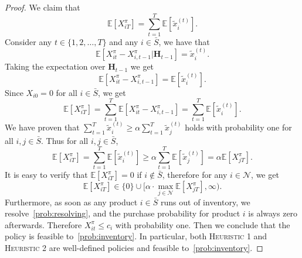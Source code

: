 \documentclass[10pt,a4paper]{amsart}
\begin{document}
\begin{proof}
We claim that
\begin{equation*}
\mathbb{E}[X_{iT}^\pi]=\sum_{t=1}^T\mathbb{E}[\tilde{x}_i^{(t)}].
\end{equation*}
Consider any $t\in\{1,2,\dots,T\}$ and any $i\in\bar{S}$, we have that
\begin{equation*}
\mathbb{E}[X_{it}^\pi-X_{i,t-1}^\pi|\bm{H}_{t-1}]=\tilde{x}_i^{(t)}.
\end{equation*}
Taking the expectation over $\bm{H}_{t-1}$ we get
\begin{equation*}
\mathbb{E}[X_{it}^\pi-X_{i,t-1}^\pi]=\mathbb{E}[\tilde{x}_i^{(t)}].
\end{equation*}
Since $X_{i0}=0$ for all $i\in\bar{S}$, we get
\begin{equation*}
\mathbb{E}[X_{iT}^\pi]=\sum_{t=1}^T\mathbb{E}[X^\pi_{it}-X^\pi_{i,t-1}]=\sum_{t=1}^T\mathbb{E}[\tilde{x}_i^{(t)}].
\end{equation*}
We have proven that $\sum_{t=1}^T\tilde{x}_i^{(t)}\geq \alpha\sum_{t=1}^T\tilde{x}_j^{(t)}$ holds with probability one for all $i,j\in\bar{S}$. Thus for all $i,j\in\bar{S}$,
$$\mathbb{E}[X_{iT}^\pi]=\sum_{t=1}^T\mathbb{E}[\tilde{x}_i^{(t)}]\geq\alpha\sum_{t=1}^T\mathbb{E}[\tilde{x}_j^{(t)}]=\alpha\mathbb{E}[X_{jT}^\pi].$$
It is easy to verify that $\mathbb{E}[X_{iT}^\pi]=0$ if $i\notin\bar{S}$, therefore for any $i\in\mathcal{N}$, we get
\begin{equation*}
\mathbb{E}[X_{iT}^\pi]\in\{0\}\cup\Big[\alpha\cdot\max_{j\in\mathcal{N}}\mathbb{E}[X_{jT}^\pi],\infty\Big).
\end{equation*}
Furthermore, as soon as any product $i\in\bar{S}$ runs out of inventory, we resolve~\ref{prob:resolving}, and the purchase probability for product $i$ is always zero afterwards. Therefore $X_{it}^\pi\leq c_i$ with probability one. Then we conclude that the policy is feasible to~\ref{prob:inventory}. In particular, both \textsc{Heuristic 1} and \textsc{Heuristic 2} are well-defined policies and feasible to~\ref{prob:inventory}.
\end{proof}
\end{document}
